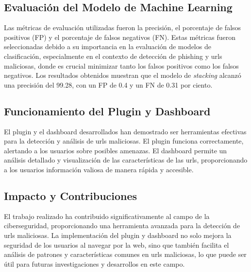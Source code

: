 \subsection*{Evaluación del Modelo de Machine Learning}
Las métricas de evaluación utilizadas fueron la precisión, el porcentaje de falsos positivos (FP) y el porcentaje de falsos negativos (FN). Estas métricas fueron seleccionadas debido a su importancia en la evaluación de modelos de clasificación, especialmente en el contexto de detección de phishing y \glspl{url} maliciosas, donde es crucial minimizar tanto los falsos positivos como los falsos negativos. Los resultados obtenidos muestran que el modelo de \textit{stacking} alcanzó una precisión del 99.28, con un FP de 0.4 y un FN de 0.31 por ciento.

\subsection*{Funcionamiento del Plugin y Dashboard}
El \gls{plugin} y el \gls{dashboard} desarrollados han demostrado ser herramientas efectivas para la detección y análisis de \glspl{url} maliciosas. El \gls{plugin} funciona correctamente, alertando a los usuarios sobre posibles amenazas. El \gls{dashboard} permite un análisis detallado y visualización de las características de las \glspl{url}, proporcionando a los usuarios información valiosa de manera rápida y accesible.

\subsection*{Impacto y Contribuciones}
El trabajo realizado ha contribuido significativamente al campo de la ciberseguridad, proporcionando una herramienta avanzada para la detección de \glspl{url} maliciosas. La implementación del \gls{plugin} y \gls{dashboard} no solo mejora la seguridad de los usuarios al navegar por la web, sino que también facilita el análisis de patrones y características comunes en \glspl{url} maliciosas, lo que puede ser útil para futuras investigaciones y desarrollos en este campo.

